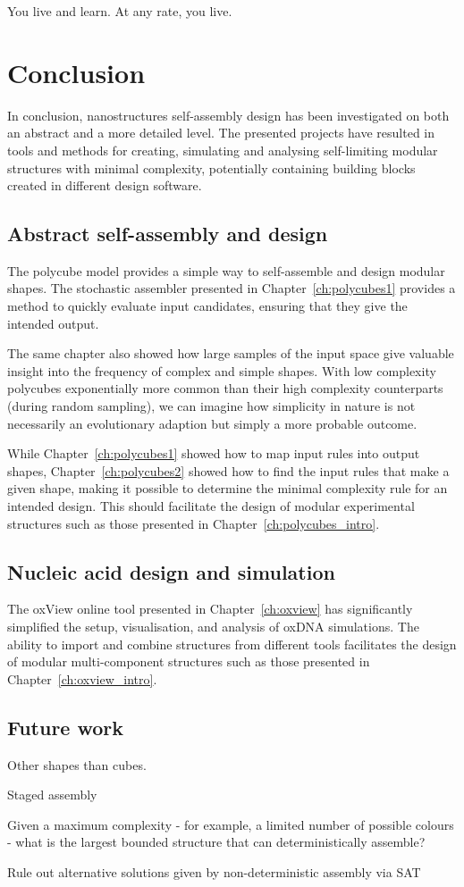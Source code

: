 \begin{savequote}[8cm]
You live and learn. At any rate, you live.
\end{savequote}

\chapter{Conclusion}

In conclusion, nanostructures self-assembly design has been investigated on both an abstract and a more detailed level. The presented projects have resulted in tools and methods for creating, simulating and analysing self-limiting modular structures with minimal complexity, potentially containing building blocks created in different design software.


\section{Abstract self-assembly and design}

The polycube model provides a simple way to self-assemble and design modular shapes. The stochastic assembler presented in Chapter~\ref{ch:polycubes1} provides a method to quickly evaluate input candidates, ensuring that they give the intended output.

The same chapter also showed how large samples of the input space give valuable insight into the frequency of complex and simple shapes. With low complexity polycubes exponentially more common than their high complexity counterparts (during random sampling), we can imagine how simplicity in nature is not necessarily an evolutionary adaption but simply a more probable outcome.

While Chapter~\ref{ch:polycubes1} showed how to map input rules into output shapes, Chapter~\ref{ch:polycubes2} showed how to find the input rules that make a given shape, making it possible to determine the minimal complexity rule for an intended design. This should facilitate the design of modular experimental structures such as those presented in Chapter~\ref{ch:polycubes_intro}.

\section{Nucleic acid design and simulation}

The oxView online tool presented in Chapter~\ref{ch:oxview} has significantly simplified the setup, visualisation, and analysis of oxDNA simulations. The ability to import and combine structures from different tools facilitates the design of modular multi-component structures such as those presented in Chapter~\ref{ch:oxview_intro}.

\section{Future work}

Other shapes than cubes.

Staged assembly

Given a maximum complexity - for example, a limited number of possible colours - what is the largest bounded structure that can deterministically assemble?

Rule out alternative solutions given by non-deterministic assembly via SAT